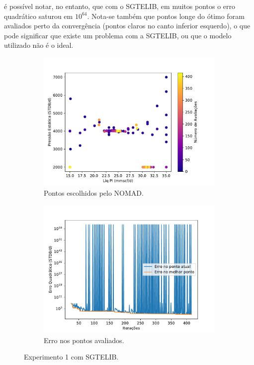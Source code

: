 é possível notar, no entanto, que com o SGTELIB, em muitos pontos o erro quadrático saturou em $10^{64}$. Nota-se também que pontos longe do ótimo foram avaliados perto da convergência (pontos claros no canto inferior esquerdo), o que pode significar que existe um problema com a SGTELIB, ou que o modelo utilizado não é o ideal.

\begin{figure}
\centering
\begin{subfigure}{0.5\textwidth}
  \centering
  \includegraphics[width=1\linewidth]{figs/setup1sgtelib_eval_points.pdf}
  \caption{Pontos escolhidos pelo NOMAD.}
  \label{fig:setup2_points}
\end{subfigure}%
\begin{subfigure}{0.5\textwidth}
  \centering
  \includegraphics[width=1\linewidth]{figs/setup1sgtelib_errors.pdf}
  \caption{Erro nos pontos avaliados.}
  \label{fig:setup2_error}
\end{subfigure}
\caption{Experimento 1 com SGTELIB.}
\label{fig:setup2_2}
\end{figure}


